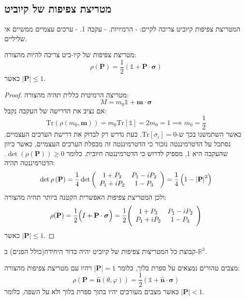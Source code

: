 \documentclass{tstextbook}
\begin{document}
\subsection{מטריצת צפיפות של קיוביט}

\begin{proposition}
המטריצת צפיפות קיוביט צריכה לקיים:
- הרמיויות.
- עקבה 1.
- ערכים עצמיים ממשיים אי שליליים.

\end{proposition}
\begin{proposition}
מטריצת צפיפות של קיו-ביט צריכה להיות מהצורה:
$$\rho\left(\mathbf{P}\right)={\frac{1}{2}}\left(\mathbb{1}+\mathbf{P}\cdot\boldsymbol\sigma\right)$$
כאשר \(|\mathbf{P}|\leq 1\).

\end{proposition}
\begin{proof}
מטריצה הרמיטית כללית תהיה מהצורה:
$$M=m_{0}\mathbb{1} +\mathbf{m}\cdot \boldsymbol{\sigma}$$
אם נציב את הדרישה של העקבה נקבל:
$$\mathrm{Tr}\left( \rho\left( m_{0},\mathbf{m} \right) \right)=m_{0}\mathrm{Tr}\left[ \mathbb{1}  \right]=2m_{0}=1\implies m_{0}=\frac{1}{2}$$
כאשר השתמשנו בכך ש-\(\mathrm{Tr}\left[ \sigma_{i} \right]=0\). כעת נדרש רק לבדוק את דרישת הערכים העצמיים. נסתכל על הדטרמיננטה נזכור כי הדטרמיננטה זה מכפלת הערכים העצמיים, כאשר כיוון שהעקבה היא 1, מספיק לדרוש כי הדטרמיננטה חיובית. כלומר \(\det\left( \rho\left( \mathbf{P} \right) \right)\geq 0\). הדטרמיננטה תהיה:
$$\operatorname*{det}\rho\left(\mathbf{P}\right)={\frac{1}{4}}\operatorname*{det}\left(\begin{array}{c c}{{1+P_{3}}}&{{P_{1}-i P_{2}}}\\ {{P_{1}+i P_{2}}}&{{1-P_{3}}}\end{array}\right)={\frac{1}{4}}\left(1-\left|\mathbf{P}\right|^{2}\right)$$
ולכן המטריצת צפיפות האפשרית הקטנה ביותר תהיה מהצורה:
$$\rho(\mathbf{P})=\frac{1}{2}\Big(I+\mathbf{P}\cdot\boldsymbol{\sigma}\Big)=\frac{1}{2}\Bigg(\begin{array}{c c}{{1+P_{3}}}&{{P_{1}-i P_{2}}}\\ {{P_{1}+i P_{2}}}&{{1-P_{3}}}\end{array}\Bigg)$$
כאשר \(\left\lvert  \mathbf{P}  \right\rvert\leq 1\).

\end{proof}
\begin{corollary}
קבוצת כל המטריצות צפיפות של קיוביט יהיה כדור היחידה(כולל הפנים) ב-\(\mathbb{R}^{3}\). 

\end{corollary}
\begin{proposition}
מצבים טהורים נמצאים על ספרת בלוך, כלומר \(\left\lvert  \mathbf{P}  \right\rvert=1\) ויהיו עם מטריצת צפיפות מהצורה:
$$\rho\left(\mathbf{P}=\mathbf{\hat{n}}\left(\theta,\varphi\right)\right)={\frac{1}{2}}\left(\mathbb{1}+\mathbf{\hat{n}}\cdot\boldsymbol\sigma\right)$$
כאשר מצבים מעורבים יהיו בתוך ספרת בלוך ולא על השפה, כלומר \(\left\lvert  \mathbf{P}  \right\rvert< 1\).

\end{proposition}
\end{document}
